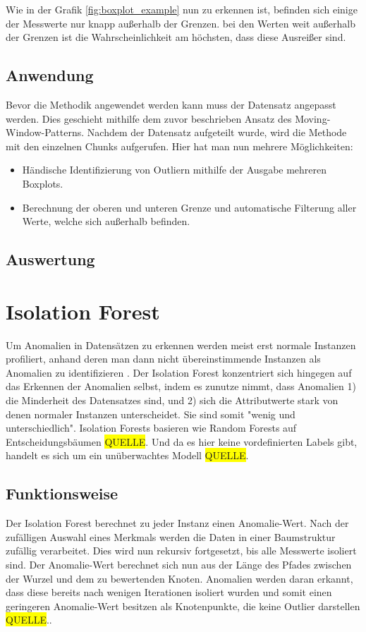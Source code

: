 \FloatBarrier
Wie in der Grafik \ref{fig:boxplot_example} nun zu erkennen ist, befinden sich einige der Messwerte nur knapp außerhalb der Grenzen. bei den Werten weit außerhalb der Grenzen ist die Wahrscheinlichkeit am höchsten, dass diese Ausreißer sind.

\subsection{Anwendung}
Bevor die Methodik angewendet werden kann muss der Datensatz angepasst werden. Dies geschieht mithilfe dem zuvor beschrieben Ansatz des Moving-Window-Patterns. Nachdem der Datensatz aufgeteilt wurde, wird die Methode mit den einzelnen Chunks aufgerufen. Hier hat man nun mehrere Möglichkeiten: 
\begin{itemize}
	\item Händische Identifizierung von Outliern mithilfe der Ausgabe mehreren Boxplots.
	\item Berechnung der oberen und unteren Grenze und automatische Filterung aller Werte, welche sich außerhalb befinden.
\end{itemize}
\subsection{Auswertung}
\newpage

\section{Isolation Forest}
Um Anomalien in Datensätzen zu erkennen werden meist erst normale Instanzen profiliert, anhand deren man dann nicht übereinstimmende Instanzen als Anomalien zu identifizieren \cite{liuIsolationForest2008}. Der Isolation Forest konzentriert sich hingegen auf das Erkennen der Anomalien selbst, indem es zunutze nimmt, dass Anomalien 1) die Minderheit des Datensatzes sind, und 2) sich die Attributwerte stark von denen normaler Instanzen unterscheidet. Sie sind somit "wenig und unterschiedlich"\cite{liuIsolationForest2008}. Isolation Forests basieren wie Random Forests auf Entscheidungsbäumen \colorbox{yellow}{QUELLE}. Und da es hier keine vordefinierten Labels gibt, handelt es sich um ein unüberwachtes Modell \colorbox{yellow}{QUELLE}.
\subsection{Funktionsweise}
Der Isolation Forest berechnet zu jeder Instanz einen Anomalie-Wert. Nach der zufälligen Auswahl eines Merkmals werden die Daten in einer Baumstruktur zufällig verarbeitet. Dies wird nun rekursiv fortgesetzt, bis alle Messwerte isoliert sind. Der Anomalie-Wert berechnet sich nun aus der Länge des Pfades zwischen der Wurzel und dem zu bewertenden Knoten. Anomalien werden daran erkannt, dass diese bereits nach wenigen Iterationen isoliert wurden und somit einen geringeren Anomalie-Wert besitzen als Knotenpunkte, die keine Outlier darstellen \colorbox{yellow}{QUELLE}..

